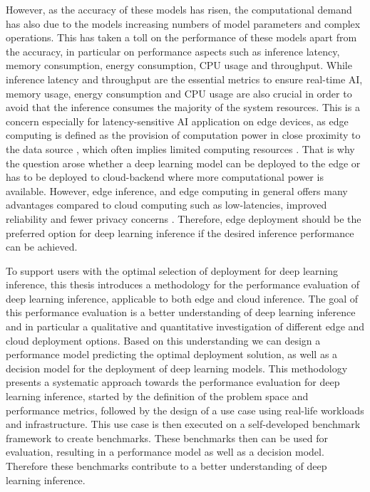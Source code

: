 However, as the accuracy of these models has risen, the computational demand has also due to the models increasing numbers of model parameters and  complex operations.
This has taken a toll on the performance of these models apart from the accuracy, in particular on performance aspects such as inference latency, memory consumption, energy consumption, CPU usage and throughput. 
While inference latency and throughput are the essential metrics to ensure real-time AI, memory usage, energy consumption and CPU usage are also crucial in order to avoid that the inference consumes the majority of the system resources.
This is a concern especially for latency-sensitive AI application on edge devices, as edge computing is defined as the provision of computation power in close proximity to the data source \cite{DBLP:journals/corr/abs-1808-05283}, which often implies limited computing resources \cite{DBLP:journals/corr/abs-1811-11268}. 
That is why the question arose whether a deep learning model can be deployed to the edge or has to be deployed to cloud-backend where more computational power is available.
However, edge inference, and edge computing in general offers many advantages compared to cloud computing such as low-latencies, improved reliability and fewer privacy concerns \cite{Mor:2018:EC:3305263.3313377}.
Therefore, edge deployment should be the preferred option for deep learning inference if the desired inference performance can be achieved.



To support users with the optimal selection of deployment for deep learning inference, this thesis introduces a methodology for the performance evaluation of deep learning inference, applicable to both edge and cloud inference.
The goal of this performance evaluation is a better understanding of deep learning inference and in particular a qualitative and quantitative investigation of different edge and cloud deployment options.
Based on this understanding we can design a performance model predicting the optimal deployment solution, as well as a decision model for the deployment of deep learning models.
This methodology presents a systematic approach towards the performance evaluation for deep learning inference, started by the definition of the problem space and performance metrics, followed by the design of a use case using real-life workloads and infrastructure. This use case is then executed on a self-developed benchmark framework to create benchmarks.
These benchmarks then can be used for evaluation, resulting in a performance model as well as a decision model. Therefore these benchmarks contribute to a better understanding of deep learning inference.


